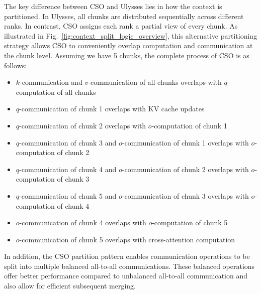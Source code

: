 The key difference between CSO and Ulysses lies in how the context is partitioned. In Ulysses, all chunks are distributed sequentially across different ranks. In contrast, CSO assigns each rank a partial view of every chunk. As illustrated in Fig.~\ref{fig:context_split_logic_overview}, this alternative partitioning strategy allows CSO to conveniently overlap computation and communication at the chunk level. Assuming we have 5 chunks, the complete process of CSO is as follows:
\begin{itemize} 
    \item $k$-communication and $v$-communication of all chunks overlaps with $q$-computation of all chunks
    \item $q$-communication of chunk 1 overlaps with KV cache updates
    \item $q$-communication of chunk 2 overlaps with $o$-computation of chunk 1
    \item $q$-communication of chunk 3 and $o$-communication of chunk 1 overlaps with $o$-computation of chunk 2
    \item $q$-communication of chunk 4 and $o$-communication of chunk 2 overlaps with $o$-computation of chunk 3
    \item $q$-communication of chunk 5 and $o$-communication of chunk 3 overlaps with $o$-computation of chunk 4
    \item $o$-communication of chunk 4 overlaps with $o$-computation of chunk 5
    \item $o$-communication of chunk 5 overlaps with cross-attention computation
\end{itemize}

In addition, the CSO partition pattern enables communication operations to be split into multiple balanced all-to-all communications. These balanced operations offer better performance compared to unbalanced all-to-all communication and also allow for efficient subsequent merging.
